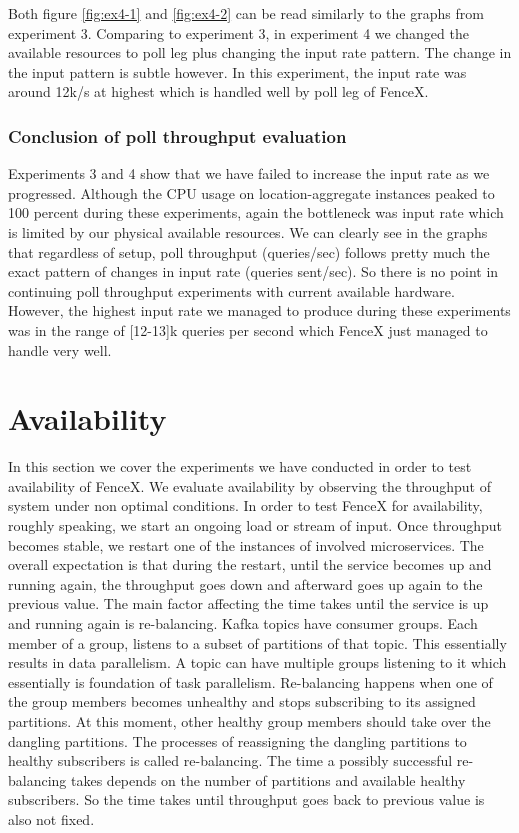 \documentclass[a4]{report}
\begin{document}
    Both figure \ref{fig:ex4-1} and \ref{fig:ex4-2} can be read similarly to the graphs from experiment 3.
    Comparing to experiment 3, in experiment 4 we changed the available resources to poll leg plus changing the input
    rate pattern.
    The change in the input pattern is subtle however.
    In this experiment, the input rate was around 12k/s at highest which is handled well by poll leg of FenceX.

    \subsubsection{Conclusion of poll throughput evaluation}
    Experiments 3 and 4 show that we have failed to increase the input rate as we progressed.
    Although the CPU usage on location-aggregate instances peaked to 100 percent during these experiments,
    again the bottleneck was input rate which is limited by our physical available resources.
    We can clearly see in the graphs that regardless of setup, poll throughput (queries/sec) follows pretty
    much the exact pattern of changes in input rate (queries sent/sec).
    So there is no point in continuing poll throughput experiments with current available hardware.
    However, the highest input rate we managed to produce during these experiments was in the range of [12-13]k queries
    per second which FenceX just managed to handle very well.


    \section{Availability}
    In this section we cover the experiments we have conducted in order to test availability of FenceX.
    We evaluate availability by observing the throughput of system under non optimal conditions.
    In order to test FenceX for availability, roughly speaking, we start an ongoing load or stream of input.
    Once throughput becomes stable, we restart one of the instances of involved microservices.
    The overall expectation is that during the restart, until the service becomes up and running again, the throughput
    goes down and afterward goes up again to the previous value.
    The main factor affecting the time takes until the service is up and running again is re-balancing.
    Kafka topics have consumer groups.
    Each member of a group, listens to a subset of partitions of that topic.
    This essentially results in data parallelism.
    A topic can have multiple groups listening to it which essentially is foundation of task parallelism.
    Re-balancing happens when one of the group members becomes unhealthy and stops subscribing to its assigned
    partitions.
    At this moment, other healthy group members should take over the dangling partitions.
    The processes of reassigning the dangling partitions to healthy subscribers is called re-balancing.
    The time a possibly successful re-balancing takes depends on the number of partitions and available
    healthy subscribers.
    So the time takes until throughput goes back to previous value is also not fixed.
\end{document}

